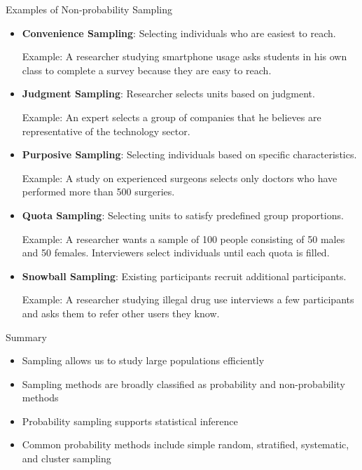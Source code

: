 \documentclass[12pt, aspectratio=169]{beamer}
\begin{document}
    \begin{frame}[allowframebreaks]{Examples of Non-probability Sampling}
        \begin{itemize}
            \item \textbf{Convenience Sampling}: Selecting individuals who are easiest to reach.
            
            Example: A researcher studying smartphone usage asks students in his own class to complete a survey because they are easy to reach.
            
            \item \textbf{Judgment Sampling}: Researcher selects units based on judgment. 
            
            Example: An expert selects a group of companies that he believes are representative of the technology sector.

            \item \textbf{Purposive Sampling}: Selecting individuals based on specific characteristics.
            
            Example: A study on experienced surgeons selects only doctors who have performed more than 500 surgeries.

            \item \textbf{Quota Sampling}: Selecting units to satisfy predefined group proportions.
            
            Example: A researcher wants a sample of 100 people consisting of 50 males and 50 females. Interviewers select individuals until each quota is filled.

            \item \textbf{Snowball Sampling}: Existing participants recruit additional participants.
            
            Example: A researcher studying illegal drug use interviews a few participants and asks them to refer other users they know.
        \end{itemize}
    \end{frame}


    \begin{frame}{Summary}
        \begin{itemize}
            \item Sampling allows us to study large populations efficiently

            \item Sampling methods are broadly classified as probability and non-probability methods

            \item Probability sampling supports statistical inference

            \item Common probability methods include simple random, stratified, systematic, and cluster sampling
        \end{itemize}
    \end{frame}
\end{document}
